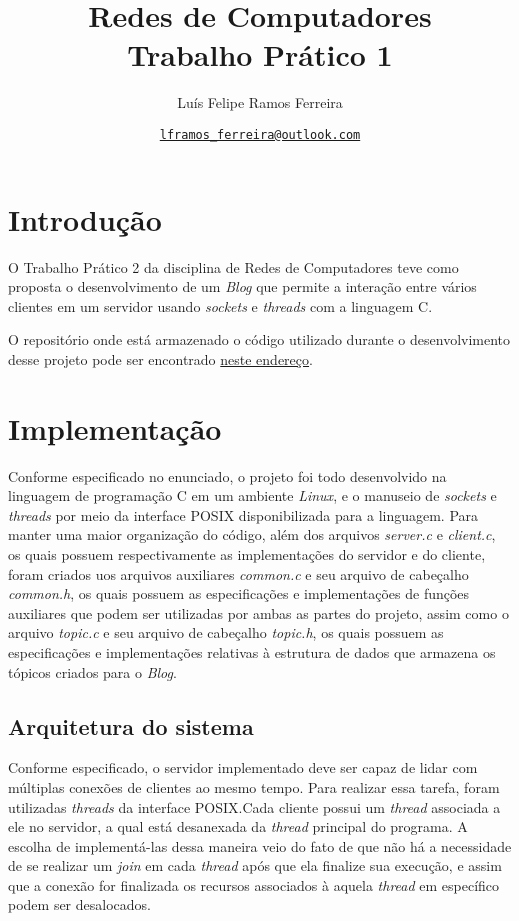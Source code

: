 \documentclass{article}
\title{Redes de Computadores \\ \large Trabalho Prático 1}
\author{Luís Felipe Ramos Ferreira}
\date{\href{mailto:lframos\_ferreira@outlook.com}{\texttt{lframos\_ferreira@outlook.com}}
}
\begin{document}
\maketitle

\section{Introdução}

O Trabalho Prático 2 da disciplina de Redes de Computadores teve como proposta
o desenvolvimento de um \textit{Blog} que permite a interação entre vários
clientes em um servidor usando \textit{sockets} e \textit{threads} com a
linguagem C.

O repositório onde está armazenado o código utilizado durante o desenvolvimento
desse projeto
pode ser encontrado \href{https://github.com/lframosferreira/tp2-redes}{neste
      endereço}.

\section{Implementação}

Conforme especificado no enunciado, o projeto foi todo desenvolvido na
linguagem de programação C em um ambiente \textit{Linux}, e o manuseio de
\textit{sockets} e \textit{threads} por
meio da interface POSIX
disponibilizada para a linguagem. Para manter uma maior organização do código,
além dos arquivos \textit{server.c} e \textit{client.c}, os quais possuem
respectivamente as implementações do servidor e do cliente,
foram criados uos arquivos auxiliares \textit{common.c} e seu arquivo de
cabeçalho
\textit{common.h}, os quais possuem as especificações e implementações de
funções auxiliares que podem ser utilizadas por ambas as partes do projeto,
assim como o arquivo \textit{topic.c} e seu arquivo de cabeçalho
\textit{topic.h},
os quais possuem as especificações e implementações relativas à estrutura de
dados que armazena os tópicos criados para o \textit{Blog}.

\subsection{Arquitetura do sistema}

Conforme especificado, o servidor implementado deve ser capaz de lidar com
múltiplas conexões de clientes ao mesmo tempo. Para realizar essa tarefa,
foram utilizadas \textit{threads} da interface POSIX.\@ Cada cliente possui um
\textit{thread} associada a ele no servidor, a qual está desanexada da
\textit{thread}
principal do programa. A escolha de implementá-las dessa maneira veio do fato
de que não há a necessidade de se realizar um \textit{join} em cada
\textit{thread} após que ela finalize sua execução, e assim
que a conexão for finalizada os recursos associados à aquela \textit{thread} em
específico podem ser desalocados.
\end{document}
